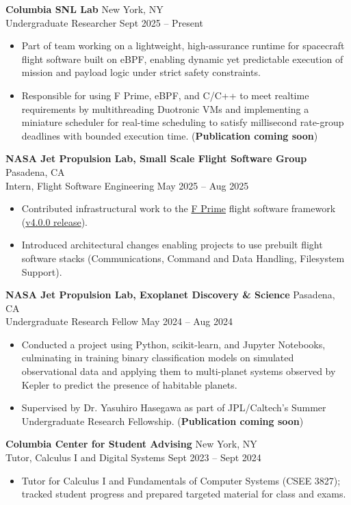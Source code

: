 \documentclass[a4paper,12pt]{article}
\newenvironment{joblong}[4]
    {
    \noindent\textbf{#1} \dotfill #2 \\
    \noindent #3 \dotfill #4 \\[3.75pt]
    \begin{minipage}[t]{\linewidth}
    \begin{itemize}[nosep,after=\strut, leftmargin=1em, itemsep=3pt,label=--]
    }
    {
    \end{itemize}
    \end{minipage}    
    }
\begin{document}
\begin{joblong}{Columbia SNL Lab}{New York, NY}{Undergraduate Researcher}{Sept 2025 -- Present}
\item Part of team working on a lightweight, high-assurance runtime for spacecraft flight software built on eBPF, enabling dynamic yet predictable execution of mission and payload logic under strict safety constraints.
\item Responsible for using F Prime, eBPF, and C/C++ to meet realtime requirements by multithreading Duotronic VMs and implementing a miniature scheduler for real-time scheduling to satisfy millisecond rate-group deadlines with bounded execution time. (\textbf{Publication coming soon})
\end{joblong}

\begin{joblong}{NASA Jet Propulsion Lab, Small Scale Flight Software Group}{Pasadena, CA}{Intern, Flight Software Engineering}{May 2025 -- Aug 2025}
\item Contributed infrastructural work to the \href{https://fprime.jpl.nasa.gov/}{F Prime} flight software framework (\href{https://github.com/nasa/fprime/releases/tag/v4.0.0}{v4.0.0 release}).
\item Introduced architectural changes enabling projects to use prebuilt flight software stacks (Communications, Command and Data Handling, Filesystem Support).
\end{joblong}

\begin{joblong}{NASA Jet Propulsion Lab, Exoplanet Discovery \& Science}{Pasadena, CA}{Undergraduate Research Fellow}{May 2024 -- Aug 2024}
\item Conducted a project using Python, scikit-learn, and Jupyter Notebooks, culminating in training binary classification models on simulated observational data and applying them to multi-planet systems observed by Kepler to predict the presence of habitable planets.
\item Supervised by Dr. Yasuhiro Hasegawa as part of JPL/Caltech's Summer Undergraduate Research Fellowship. (\textbf{Publication coming soon})
\end{joblong}

\begin{joblong}{Columbia Center for Student Advising}{New York, NY}{Tutor, Calculus I and Digital Systems}{Sept 2023 -- Sept 2024}
\item Tutor for Calculus I and Fundamentals of Computer Systems (CSEE 3827); tracked student progress and prepared targeted material for class and exams.
\end{joblong}
\end{document}
